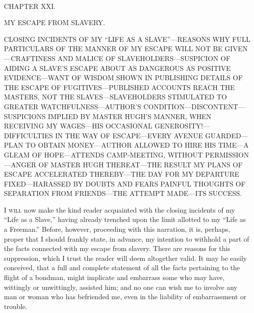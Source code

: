 {\protect\hypertarget{321}{}{}}

~

{CHAPTER XXI.}

MY ESCAPE FROM SLAVERY.

{CLOSING INCIDENTS OF MY ``LIFE AS A SLAVE''---REASONS WHY FULL
PARTICULARS OF THE MANNER OF MY ESCAPE WILL NOT BE GIVEN---CRAFTINESS
AND MALICE OF SLAVEHOLDERS---SUSPICION OF AIDING A SLAVE'S ESCAPE ABOUT
AS DANGEROUS AS POSITIVE EVIDENCE---WANT OF WISDOM SHOWN IN PUBLISHING
DETAILS OF THE ESCAPE OF FUGITIVES---PUBLISHED ACCOUNTS REACH THE
MASTERS, NOT THE SLAVES---SLAVEHOLDERS STIMULATED TO GREATER
WATCHFULNESS---AUTHOR'S CONDITION---DISCONTENT---SUSPICIONS IMPLIED BY
MASTER HUGH'S MANNER, WHEN RECEIVING MY WAGES---HIS OCCASIONAL
GENEROSITY!---DIFFICULTIES IN THE WAY OF ESCAPE---EVERY AVENUE
GUARDED---PLAN TO OBTAIN MONEY---AUTHOR ALLOWED TO HIRE HIS TIME---A
GLEAM OF HOPE---ATTENDS CAMP-MEETING, WITHOUT PERMISSION---ANGER OF
MASTER HUGH THEREAT---THE RESULT MY PLANS OF ESCAPE ACCELERATED
THEREBY---THE DAY FOR MY DEPARTURE FIXED---HARASSED BY DOUBTS AND FEARS
PAINFUL THOUGHTS OF SEPARATION FROM FRIENDS---THE ATTEMPT MADE---ITS
SUCCESS.}

\textsc{I will} now make the kind reader acquainted with the closing
incidents of my ``Life as a Slave,'' having already trenched upon the
limit allotted to my ``Life as a Freeman.'' Before, however, proceeding
with this narration, it is, perhaps, proper that I should frankly state,
in advance, my intention to withhold a part of the facts connected with
my escape from slavery. There are reasons for this suppression, which I
trust the reader will deem altogether valid. It may be easily conceived,
that a full and complete statement of all the facts pertaining to the
flight of a bondman, might implicate and embarrass some who may
{\protect\hypertarget{322}{}{}}have, wittingly or unwittingly, assisted
him; and no one can wish me to involve any man or woman who has
befriended me, even in the liability of embarrassment or trouble.

